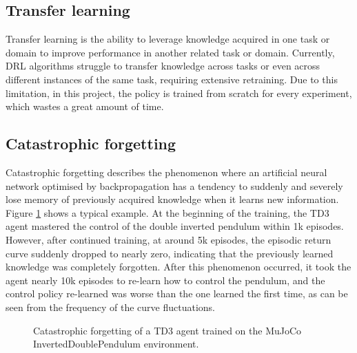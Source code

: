 \subsection{Transfer learning}

Transfer learning is the ability to leverage knowledge acquired in one task or domain to improve performance in another related task or domain. Currently, DRL algorithms struggle to transfer knowledge across tasks or even across different instances of the same task, requiring extensive retraining. Due to this limitation, in this project, the policy is trained from scratch for every experiment, which wastes a great amount of time.

\subsection{Catastrophic forgetting}

Catastrophic forgetting describes the phenomenon where an artificial neural network optimised by backpropagation has a tendency to suddenly and severely lose memory of previously acquired knowledge when it learns new information. Figure \ref{fig:catastrophic-forgetting} shows a typical example. At the beginning of the training, the TD3 agent mastered the control of the double inverted pendulum within 1k episodes. However, after continued training, at around 5k episodes, the episodic return curve suddenly dropped to nearly zero, indicating that the previously learned knowledge was completely forgotten. After this phenomenon occurred, it took the agent nearly 10k episodes to re-learn how to control the pendulum, and the control policy re-learned was worse than the one learned the first time, as can be seen from the frequency of the curve fluctuations.

\begin{figure}[htbp]
   \centering
   
   \caption{Catastrophic forgetting of a TD3 agent trained on the MuJoCo InvertedDoublePendulum environment.}
   \label{fig:catastrophic-forgetting}
\end{figure}
